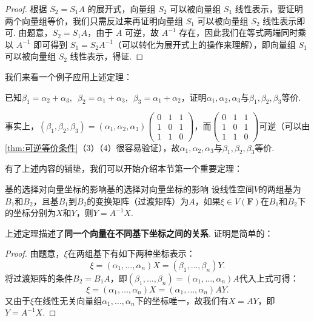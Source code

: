 \begin{proof}
    根据 $S_2 = S_1A$ 的展开式，向量组 $S_2$ 可以被向量组 $S_1$ 线性表示，要证明两个向量组等价，我们只需反过来再证明向量组 $S_1$ 可以被向量组 $S_2$ 线性表示即可. 由题意，$S_2 = S_1A$，由于 $A$ 可逆，故 $A^{-1}$ 存在，因此我们在等式两端同时乘以 $A^{-1}$ 即可得到 $S_1 = S_2A^{-1}$（可以转化为展开式上的操作来理解），即向量组 $S_1$ 可以被向量组 $S_2$ 线性表示，得证.
\end{proof}

我们来看一个例子应用上述定理：
\begin{example}{}{}
    已知$\beta_1=\alpha_2+\alpha_3,\enspace\beta_2=\alpha_1+\alpha_3,\enspace\beta_3=\alpha_1+\alpha_2$，证明$\alpha_1,\alpha_2,\alpha_3$与$\beta_1,\beta_2,\beta_3$等价.
\end{example}

\begin{solution}
    事实上，$(\beta_1,\beta_2,\beta_3)=(\alpha_1,\alpha_2,\alpha_3)\begin{pmatrix}
            0 & 1 & 1 \\
            1 & 0 & 1 \\
            1 & 1 & 0
        \end{pmatrix}$，而$\begin{pmatrix}
            0 & 1 & 1 \\
            1 & 0 & 1 \\
            1 & 1 & 0
        \end{pmatrix}$可逆（可以由\autoref{thm:可逆等价条件}（3）（4）很容易验证），故$\alpha_1,\alpha_2,\alpha_3$与$\beta_1,\beta_2,\beta_3$等价.
\end{solution}

有了上述内容的铺垫，我们可以开始介绍本节第一个重要定理：
\begin{theorem}{基的选择对向量坐标的影响}{基的选择对向量坐标的影响}
    设线性空间$V$的两组基为$B_1$和$B_2$，且基$B_1$到$B_2$的变换矩阵（过渡矩阵）为$A$，如果$\xi \in V(\mathbf{F})$在$B_1$和$B_2$下的坐标分别为$X$和$Y$，则$Y=A^{-1}X$.
\end{theorem}
上述定理描述了\textbf{同一个向量在不同基下坐标之间的关系}. 证明是简单的：

\begin{proof}
    由题意，$\xi$在两组基下有如下两种坐标表示：
    \[\xi=(\alpha_1,\ldots,\alpha_n)X=(\beta_1,\ldots,\beta_n)Y.\]
    将过渡矩阵的条件$B_2=B_1A$，即$(\beta_1,\ldots,\beta_n)=(\alpha_1,\ldots,\alpha_n)A$代入上式可得：
    \[\xi=(\alpha_1,\ldots,\alpha_n)X=(\alpha_1,\ldots,\alpha_n)AY.\]
    又由于$\xi$在线性无关向量组$\alpha_1,\ldots,\alpha_n$下的坐标唯一，故我们有$X=AY$，即$Y=A^{-1}X$.
\end{proof}


